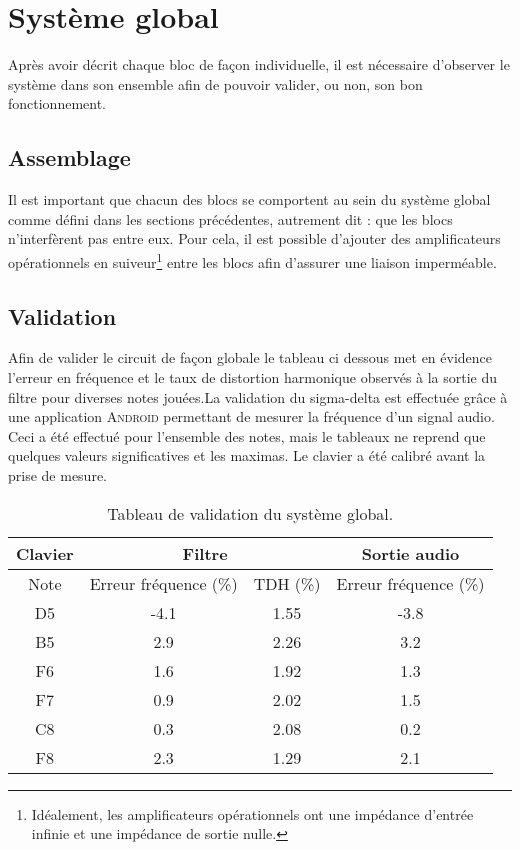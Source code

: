 \chapter{Système global}
Après avoir décrit chaque bloc de façon individuelle, il est nécessaire d'observer le système dans son ensemble afin de pouvoir valider, ou non, son bon fonctionnement. 

\section{Assemblage}
Il est important que chacun des blocs se comportent au sein
du système global comme défini dans les sections précédentes, 
autrement dit : que les blocs n'interfèrent pas entre eux.
Pour cela, il est possible d'ajouter des amplificateurs 
opérationnels en suiveur\footnote{Idéalement, les amplificateurs opérationnels
ont une impédance d'entrée infinie et une impédance de sortie nulle.} 
entre les blocs afin d'assurer une liaison imperméable. 

\section{Validation}
Afin de valider le circuit de façon globale le tableau ci
dessous met en évidence l'erreur en fréquence et le taux de
distortion harmonique observés à la sortie du filtre pour
diverses notes jouées.La validation du sigma-delta est
effectuée grâce à une application \textsc{Android} permettant de
mesurer la fréquence d'un signal audio. Ceci a été effectué
pour l'ensemble des notes, mais le tableaux ne reprend que
quelques valeurs significatives et les maximas. Le clavier a
été calibré avant la prise de mesure.

\begin{table}
	\centering
	\begin{tabular}{|c|c|c|c|}
		\hline
		Clavier &  \multicolumn{2}{c|}{Filtre} &  Sortie audio \\
		 \hline
		Note &  Erreur fréquence (\%) & TDH (\%) &  Erreur fréquence (\%) \\
		\hline
		D5 &  -4.1 & 1.55 & -3.8\\
		B5 &  2.9 & 2.26 & 3.2\\
		F6 &  1.6 & 1.92 & 1.3\\
		F7 &  0.9 & 2.02 & 1.5\\
		C8 &  0.3 & 2.08 & 0.2\\
		F8 &  2.3 & 1.29 & 2.1\\
		\hline
	\end{tabular}
	\caption{Tableau de validation du système global.}
	\label{tab:tab-global}
\end{table}

